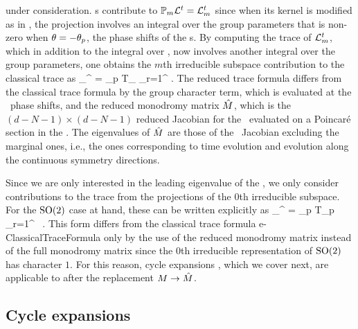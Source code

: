 \documentclass[aip,cha,
reprint,
secnumarabic,
nofootinbib, tightenlines,
nobibnotes, showkeys, showpacs,
superscriptaddress,
]{revtex4-1}
\begin{document}
{under consideration. \Rpo s contribute to 
$\mathbb{P}_m {\cal L}^t = {\cal L}_m^t$ since when its kernel is modified as 
in , the projection involves an integral over the 
group parameters that is non-zero when $\theta= - \theta_{p}$, 
the phase shifts of the \rpo s. By computing the trace of ${\cal L}_m^t$, 
which in addition to the integral over \statesp , now involves 
another integral over the group parameters, one obtains the $m$th 
irreducible subspace contribution to the classical trace as
\beq
\sum_{}^{\infty}  = \sum_p T_{\rpprime}
\sum_{r=1}^{\infty}  .
The reduced trace formula  differs 
from the classical trace formula  
by the group character term, which is evaluated at the \rpo\ phase 
shifts, and the reduced monodromy matrix $\hat{{M}}$, which is 
the $(d-N-1)\times(d-N-1)$ reduced Jacobian for the \rpo\ evaluated 
on a Poincar\'e section in the \reducedsp . The eigenvalues of 
$\hat{{M}}$ are those of the \rpo\ Jacobian 
 excluding the marginal ones, i.e., the ones 
corresponding to time evolution and evolution along the continuous 
symmetry directions.

Since we are only interested in the leading eigenvalue of the 
\evOper , we only consider contributions to the trace 
 from the projections 
 of the $0$th irreducible subspace. For 
the $\textrm{SO}(2)$ case at hand, these can be written explicitly as
\beq
\sum_{}^{\infty}  = \sum_p T_p
\sum_{r=1}^{\infty}  \, .
This form differs from the classical trace formula 
{e-ClassicalTraceFormula} only by the use of the reduced monodromy 
matrix instead of the full monodromy matrix since the $0$th 
irreducible representation of $\textrm{SO}(2)$ has character $1$. For 
this reason, cycle expansions , which we cover next, are 
applicable to  after the replacement 
${M} \rightarrow \hat{{M}}$.

\subsection{Cycle expansions}
\label{s-CycExp}

}
\end{document}
